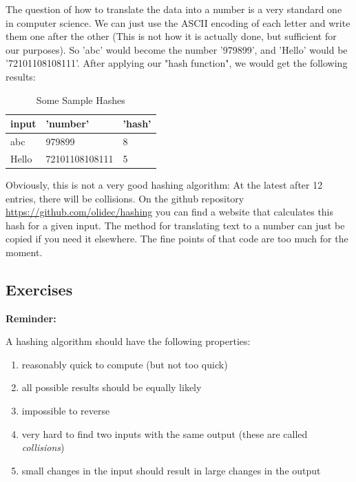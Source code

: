 \documentclass[11pt,a4paper]{report}
\begin{document}
The question of how to translate the data into a number is a very standard one in computer science.
We can just use the ASCII encoding of each letter and write them one after the other (This is not how it is actually done, but sufficient for our purposes).
So 'abc' would become the number '979899', and 'Hello' would be '72101108108111'.
After applying our "hash function", we would get the following results:

\begin{table}[h]
\centering
\begin{tabular}{|l|l|l|}
\hline
input & 'number' & 'hash' \\
\hline
abc & 979899 & 8 \\
Hello & 72101108108111 & 5 \\
\hline
\end{tabular}
\caption{Some Sample Hashes}
\end{table}


Obviously, this is not a very good hashing algorithm: At the latest after 12 entries, there will be collisions.
On the github repository \url{https://github.com/olidec/hashing} you can find a website that calculates this hash for a given input.
The method for translating text to a number can just be copied if you need it elsewhere.
The fine points of that code are too much for the moment.
\subsection{Exercises}
{\bf Reminder: }

A hashing algorithm should have the following properties:
\begin{enumerate}
\item  reasonably quick to compute (but not too quick)
\item  all possible results should be equally likely
\item  impossible to reverse
\item  very hard to find two inputs with the same output (these are called \emph{collisions})
\item  small changes in the input should result in large changes in the output
\end{enumerate}
\end{document}
